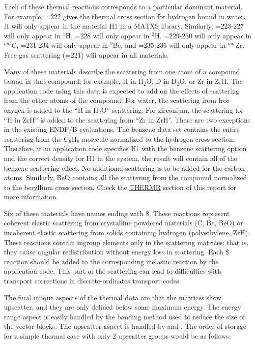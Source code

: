 Each of these thermal reactions corresponds to a particular dominant
material.  For example, =222 gives the thermal cross
section for hydrogen bound in water.  It will only appear in the
material H1 in a MATXS library.  Similarly, =223-227
will only appear in $^{1}$H, =228 will only appear
in $^{2}$H, =229-230 will only appear in $^{nat}$C,
=231-234 will only appear in $^{9}$Be, and
=235-236 will only appear
in $^{nat}$Zr.  Free-gas scattering (=221) will appear
in all materials.

Many of these materials describe the scattering from one atom of a
compound bound in that compound; for example, H in H$_2$O, D in D$_2$O,
or Zr in ZrH.  The application code using this data is expected to add
on the effects of scattering from the other atoms of the compound.
For water, the scattering from free oxygen is added to the
``H in H$_2$O'' scattering.  For zirconium, the scattering for
``H in ZrH'' is added to the scattering from ``Zr in ZrH''.  There
are two exceptions in the existing ENDF/B evaluations.  The benzene
data set contains the entire scattering from the C$_6$H$_6$ molecule
normalized to the hydrogen cross section.  Therefore, if an application
code specifies H1 with the benzene scattering option and the correct
density for H1 in the system, the result will contain all of the benzene
scattering effect.  No additional scattering is to be added for the
carbon atoms.  Similarly, BeO contains all the scattering from the
compound normalized to the beryllium cross section.  Check the
\hyperlink{sTHERMRhy}{THERMR}
section of this report for more information.

Six of these materials have names ending with \$.  These reactions
represent coherent elastic scattering from crystalline powdered
materials (C, Be, BeO) or incoherent elastic scattering from solids
containing hydrogen (polyethylene, ZrH).
These reactions contain ingroup elements only in the scattering
matrices; that is, they cause angular redistribution without
energy loss in scattering.  Each \$ reaction should be added
to the corresponding inelastic reaction by the application code.
This part of the scattering can lead to difficulties with
transport corrections in discrete-ordinates transport codes.

The final unique aspects of the thermal data are that the matrices
show upscatter, and they are only defined below some maximum
energy.  The energy range aspect is easily handled by the banding
method used to reduce the size of the vector blocks.  The upscatter
aspect is handled by  and .  The order of
storage for a simple thermal case with only 2 upscatter groups would
be as follows:

